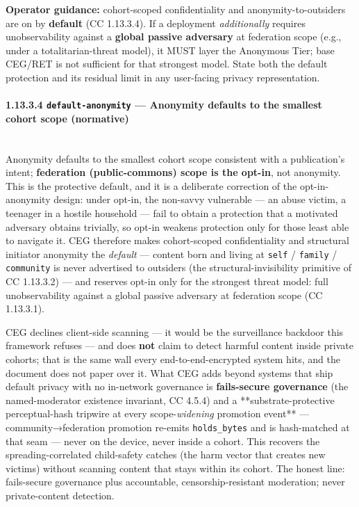 \documentclass[11pt]{article}
\begin{document}
\textbf{Operator guidance:} cohort-scoped confidentiality and anonymity-to-outsiders are on by \textbf{default} (CC 1.13.3.4). If a deployment \textit{additionally} requires unobservability against a \textbf{global passive adversary} at federation scope (e.g., under a totalitarian-threat model), it MUST layer the Anonymous Tier; base CEG/RET is not sufficient for that strongest model. State both the default protection and its residual limit in any user-facing privacy representation.


\paragraph{1.13.3.4 \texttt{default-anonymity} — Anonymity defaults to the smallest cohort scope (normative)}\mbox{}\\


Anonymity defaults to the smallest cohort scope consistent with a publication's intent; \textbf{federation (public-commons) scope is the opt-in}, not anonymity. This is the protective default, and it is a deliberate correction of the opt-in-anonymity design: under opt-in, the non-savvy vulnerable — an abuse victim, a teenager in a hostile household — fail to obtain a protection that a motivated adversary obtains trivially, so opt-in weakens protection only for those least able to navigate it. CEG therefore makes cohort-scoped confidentiality and structural initiator anonymity the \textit{default} — content born and living at \texttt{self} / \texttt{family} / \texttt{community} is never advertised to outsiders (the structural-invisibility primitive of CC 1.13.3.2) — and reserves opt-in only for the strongest threat model: full unobservability against a global passive adversary at federation scope (CC 1.13.3.1).


CEG declines client-side scanning — it would be the surveillance backdoor this framework refuses — and does \textbf{not} claim to detect harmful content inside private cohorts; that is the same wall every end-to-end-encrypted system hits, and the document does not paper over it. What CEG adds beyond systems that ship default privacy with no in-network governance is \textbf{fails-secure governance} (the named-moderator existence invariant, CC 4.5.4) and a **substrate-protective perceptual-hash tripwire at every scope-\textit{widening} promotion event** — community→federation promotion re-emits \texttt{holds\_bytes} and is hash-matched at that seam — never on the device, never inside a cohort. This recovers the spreading-correlated child-safety catches (the harm vector that creates new victims) without scanning content that stays within its cohort. The honest line: fails-secure governance plus accountable, censorship-resistant moderation; never private-content detection.
\end{document}
